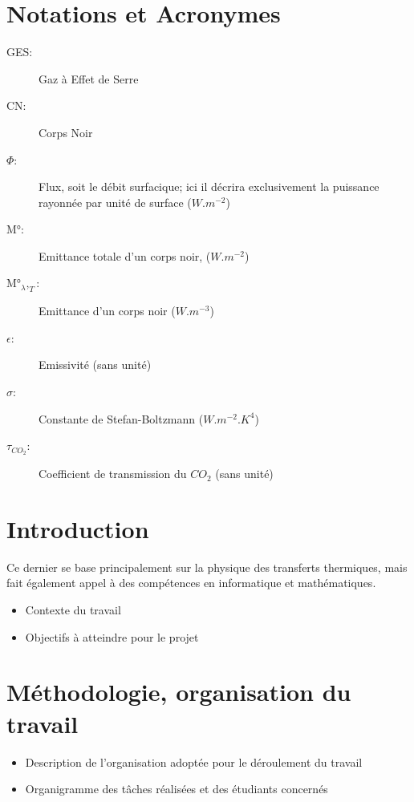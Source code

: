 \documentclass[a4paper, 12pt]{report} %
\begin{document}

\newpage
\chapter*{Notations et Acronymes} 

\begin{description}
	\item[GES:] Gaz à Effet de Serre
    \item[CN:] Corps Noir
    
    \item[$\Phi$:] Flux, soit le débit surfacique; ici il décrira exclusivement 
	la puissance rayonnée par unité de surface ($W.m^{-2}$)
    \item[M°:] Emittance totale d'un corps noir, ($W.m^{-2}$)
    \item[M°$_\lambda,_T$:] Emittance d'un corps noir ($W.m^{-3}$)
    \item[$\epsilon$:] Emissivité (sans unité)
    \item[$\sigma$:] Constante de Stefan-Boltzmann ($W.m^{-2}.K^{4}$)
    \item[$\tau_{CO_2}$:] Coefficient de transmission du $CO_2$ (sans unité)
\end{description}


\newpage
\chapter*{Introduction}				

Ce dernier se base principalement 
sur la physique des transferts thermiques, mais fait également
appel à des compétences en informatique et mathématiques. 
\begin{itemize}
\item Contexte du travail
	  
\item Objectifs à atteindre pour le projet
\end{itemize}


\chapter{Méthodologie, organisation du travail}

\begin{itemize}
\item Description de l'organisation adoptée pour le déroulement du travail
\item Organigramme des tâches réalisées et des étudiants concernés
\end{itemize}
\end{document}
